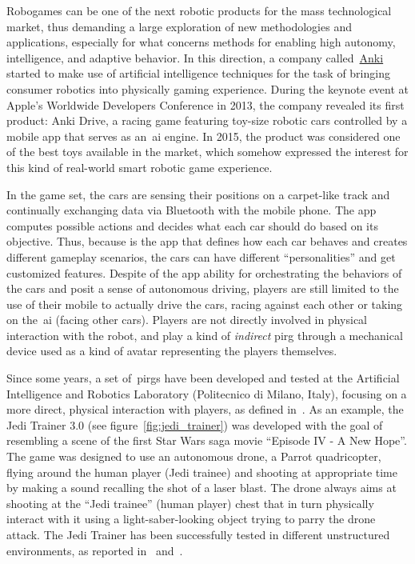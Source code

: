 Robogames can be one of the next robotic products for the mass technological market, thus demanding a large exploration of new methodologies and applications, especially for what concerns methods for enabling high autonomy, intelligence, and adaptive behavior. In this direction, a company called~\href{https://anki.com/en-us}{Anki} started to make use of artificial intelligence techniques for the task of bringing consumer robotics into physically gaming experience. During the keynote event at Apple's Worldwide Developers Conference in 2013, the company revealed its first product: Anki Drive, a racing game featuring toy-size robotic cars controlled by a mobile app that serves as an~\gls{ai} engine. In 2015, the product was considered one of the best toys available in the market, which somehow expressed the interest for this kind of real-world smart robotic game experience. 

In the game set, the cars are sensing their positions on a carpet-like track and continually exchanging data via Bluetooth with the mobile phone. The app computes possible actions and decides what each car should do based on its objective. Thus, because is the app that defines how each car behaves and creates different gameplay scenarios, the cars can have different ``personalities'' and get customized features. Despite of the app ability for orchestrating the behaviors of the cars and posit a sense of autonomous driving, players are still limited to the use of their mobile to actually drive the cars, racing against each other or taking on the~\gls{ai} (facing other cars). Players are not directly involved in physical interaction with the robot, and play a kind of \textit{indirect} \gls{pirg} through a mechanical device used as a kind of avatar representing the players themselves.

Since some years, a set of~\gls{pirg}s have been developed and tested at the Artificial Intelligence and Robotics Laboratory (Politecnico di Milano, Italy), focusing on a more direct, physical interaction with players, as defined in~\cite{martinoia_physically_2013}. As an example, the Jedi Trainer 3.0 (see figure~\ref{fig:jedi_trainer}) was developed with the goal of resembling a scene of the first Star Wars saga movie ``Episode IV - A New Hope''. The game was designed to use an autonomous drone, a Parrot quadricopter, flying around the human player (Jedi trainee) and shooting at appropriate time by making a sound recalling the shot of a laser blast. The drone always aims at shooting at the ``Jedi trainee'' (human player) chest that in turn physically interact with it using a light-saber-looking object trying to parry the drone attack. The Jedi Trainer has been successfully tested in different unstructured environments, as reported in~\cite{bonarini_timing_2014} and~\cite{martinoia_physically_2013}.

